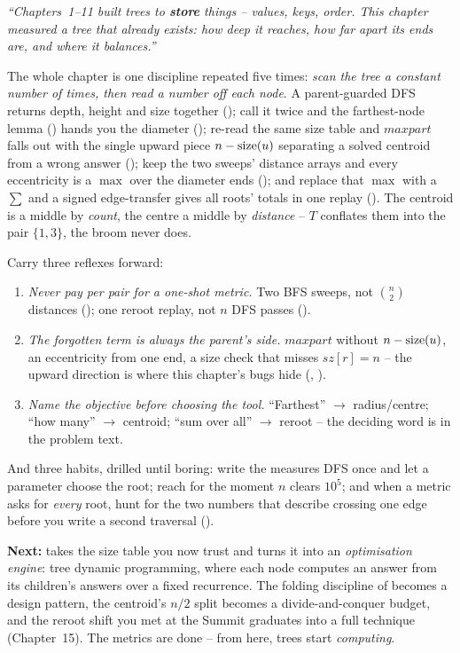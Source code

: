 \begin{lastword}
\emph{``Chapters~1--11 built trees to \textbf{store} things -- values, keys, order. This chapter
measured a tree that already exists: how deep it reaches, how far apart its ends are, and where
it balances.''}

\medskip
The whole chapter is one discipline repeated five times: \emph{scan the tree a constant number of
times, then read a number off each node}. A parent-guarded DFS returns depth, height and size
together (); call it twice and the farthest-node lemma ()
hands you the diameter (); re-read the same size table and $\mathit{maxpart}$
falls out with the single upward piece $n-\operatorname{size}(u)$ separating a solved centroid from a wrong
answer (); keep the two sweeps' distance arrays and every eccentricity is a
$\max$ over the diameter ends (); and replace that $\max$ with a $\sum$ and a
signed edge-transfer gives all roots' totals in one replay (). The centroid is
a middle by \emph{count}, the centre a middle by \emph{distance} -- $T$ conflates them into the pair
$\{1,3\}$, the broom never does.

\medskip
Carry three reflexes forward:
\begin{enumerate}[nosep, leftmargin=1.6em]
  \item \emph{Never pay per pair for a one-shot metric.} Two BFS sweeps, not $\binom{n}{2}$
        distances (); one reroot replay, not $n$ DFS passes ().
  \item \emph{The forgotten term is always the parent's side.} $\mathit{maxpart}$ without
        $n-\operatorname{size}(u)$, an eccentricity from one end, a size check that misses $\mathit{sz}[r]=n$ --
        the upward direction is where this chapter's bugs hide (,
        ).
  \item \emph{Name the objective before choosing the tool.} ``Farthest'' $\to$ radius/centre;
        ``how many'' $\to$ centroid; ``sum over all'' $\to$ reroot -- the deciding word is in the
        problem text.
\end{enumerate}

\medskip
And three habits, drilled until boring: write the measures DFS once and let a parameter choose
the root; reach for  the moment $n$ clears $10^{5}$; and when a metric asks for
\emph{every} root, hunt for the two numbers that describe crossing one edge before you write a
second traversal ().

\medskip
\textbf{Next:}  takes the size table you now trust and turns it into an \emph{optimisation
engine}: tree dynamic programming, where each node computes an answer from its children's answers
over a fixed recurrence. The folding discipline of  becomes a design pattern,
the centroid's $n/2$ split becomes a divide-and-conquer budget, and the reroot shift you met at the
Summit graduates into a full technique (Chapter~15). The metrics are done -- from here, trees start
\emph{computing}.
\end{lastword}
